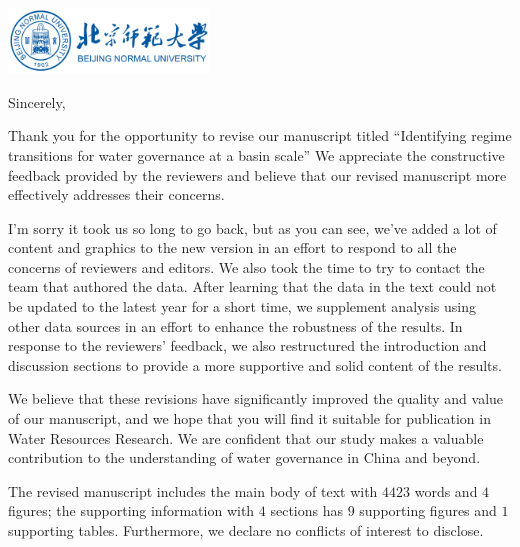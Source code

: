 \documentclass[11pt,a4paper,roman]{moderncv}
\begin{document}
\begin{minipage}[t]{\textwidth}
\includegraphics[width=0.40\textwidth]{bnu}
\end{minipage}


\opening{\vspace*{-2em}}
\closing{Sincerely,}{\vspace*{-2em}}
\makelettertitle
\justify

Thank you for the opportunity to revise our manuscript titled ``Identifying regime transitions for water governance at a basin scale'' We appreciate the constructive feedback provided by the reviewers and believe that our revised manuscript more effectively addresses their concerns.

I'm sorry it took us so long to go back, but as you can see, we've added a lot of content and graphics to the new version in an effort to respond to all the concerns of reviewers and editors. We also took the time to try to contact the team that authored the data. After learning that the data in the text could not be updated to the latest year for a short time, we supplement analysis using other data sources in an effort to enhance the robustness of the results.
In response to the reviewers' feedback, we also restructured the introduction and discussion sections to provide a more supportive and solid content of the results.

We believe that these revisions have significantly improved the quality and value of our manuscript, and we hope that you will find it suitable for publication in Water Resources Research. We are confident that our study makes a valuable contribution to the understanding of water governance in China and beyond.

The revised manuscript includes the main body of text with $4423$ words and $4$ figures; the supporting information with $4$ sections has $9$ supporting figures and $1$ supporting tables. Furthermore, we declare no conflicts of interest to disclose.
\end{document}
